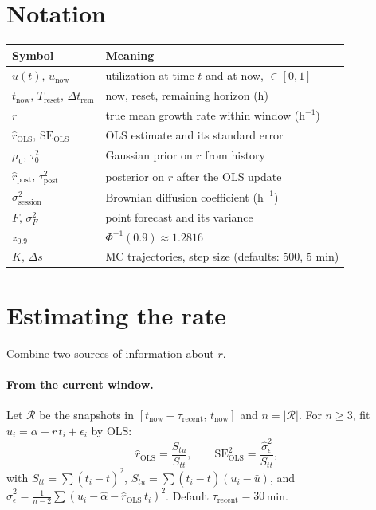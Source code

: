 \documentclass[11pt]{article}
\newcommand{\sighat}{\hat\sigma}
\newcommand{\rpost}{\hat r_{\text{post}}}
\newcommand{\taupostsq}{\tau_{\text{post}}^2}
\newcommand{\tauzerosq}{\tau_0^2}
\newcommand{\rols}{\hat r_{\text{OLS}}}
\newcommand{\seols}{\mathrm{SE}_{\text{OLS}}}
\newcommand{\seolssq}{\mathrm{SE}_{\text{OLS}}^2}
\newcommand{\sigsessionsq}{\sigma_{\text{session}}^2}
\newcommand{\unow}{u_{\text{now}}}
\newcommand{\tnow}{t_{\text{now}}}
\newcommand{\Treset}{T_{\text{reset}}}
\newcommand{\Dtrem}{\Delta t_{\text{rem}}}
\newcommand{\taurecent}{\tau_{\text{recent}}}
\begin{document}
\section{Notation}

\begin{center}
\begin{tabular}{@{}ll@{}}
\toprule
Symbol & Meaning \\
\midrule
$u(t),\, \unow$              & utilization at time $t$ and at now, $\in [0,1]$ \\
$\tnow,\, \Treset,\, \Dtrem$ & now, reset, remaining horizon (h) \\
$r$                          & true mean growth rate within window ($\mathrm{h}^{-1}$) \\
$\rols,\, \seols$            & OLS estimate and its standard error \\
$\mu_0,\, \tauzerosq$        & Gaussian prior on $r$ from history \\
$\rpost,\, \taupostsq$       & posterior on $r$ after the OLS update \\
$\sigsessionsq$              & Brownian diffusion coefficient ($\mathrm{h}^{-1}$) \\
$F,\, \sigma_F^2$            & point forecast and its variance \\
$z_{0.9}$                    & $\Phi^{-1}(0.9) \approx 1.2816$ \\
$K,\, \Delta s$              & MC trajectories, step size (defaults: 500, 5 min) \\
\bottomrule
\end{tabular}
\end{center}

\section{Estimating the rate}\label{sec:rate}

Combine two sources of information about $r$.

\paragraph{From the current window.} Let $\mathcal{R}$ be the snapshots in
$[\tnow - \taurecent,\, \tnow]$ and $n = \lvert\mathcal{R}\rvert$. For $n
\geq 3$, fit $u_i = \alpha + r\,t_i + \epsilon_i$ by OLS:
\[
  \rols = \frac{S_{tu}}{S_{tt}},
  \qquad \seolssq = \frac{\sighat_\epsilon^2}{S_{tt}},
\]
with $S_{tt} = \sum (t_i - \bar t)^2$, $S_{tu} = \sum (t_i - \bar t)(u_i -
\bar u)$, and $\sighat_\epsilon^2 = \tfrac{1}{n-2} \sum (u_i - \hat\alpha -
\rols\,t_i)^2$. Default $\taurecent = 30$\,min.
\end{document}
